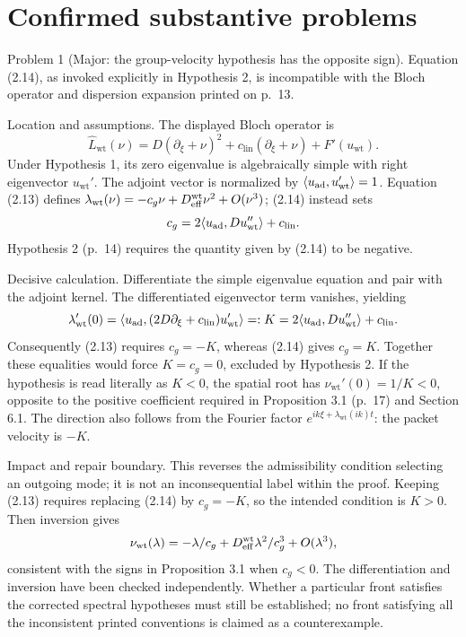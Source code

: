 \documentclass[10pt]{article}
\begin{document}
\section*{Confirmed substantive problems}
Problem 1 (Major: the group-velocity hypothesis has the opposite sign).  Equation (2.14), as invoked explicitly in Hypothesis 2, is incompatible with the Bloch operator and dispersion expansion printed on p. 13.\par
Location and assumptions. The displayed Bloch operator is \[\widehat L_\mathrm{wt}(\nu)
 =D(\partial_\xi+\nu)^2+c_\mathrm{lin}(\partial_\xi+\nu)+F'(u_\mathrm{wt}).\] Under Hypothesis 1, its zero eigenvalue is algebraically simple with right eigenvector \(u_\mathrm{wt}'\). The adjoint vector is normalized by \(\langle u_{\rm ad},u_\mathrm{wt}'\rangle=1\). Equation (2.13) defines \(\lambda_\mathrm{wt}(\nu)=-c_g\nu+D_{\rm eff}^{\mathrm{wt}}\nu^2+O(\nu^3)\); (2.14) instead sets \[c_g=2\langle u_{\rm ad},Du_\mathrm{wt}''\rangle+c_\mathrm{lin}.\] Hypothesis 2 (p. 14) requires the quantity given by (2.14) to be negative.\par
Decisive calculation. Differentiate the simple eigenvalue equation and pair with the adjoint kernel. The differentiated eigenvector term vanishes, yielding \[\lambda_\mathrm{wt}'(0)
 =\langle u_{\rm ad},(2D\partial_\xi+c_\mathrm{lin})u_\mathrm{wt}'\rangle
 =:K=2\langle u_{\rm ad},Du_\mathrm{wt}''\rangle+c_\mathrm{lin}.\] Consequently (2.13) requires \(c_g=-K\), whereas (2.14) gives \(c_g=K\). Together these equalities would force \(K=c_g=0\), excluded by Hypothesis 2. If the hypothesis is read literally as \(K<0\), the spatial root has \(\nu_\mathrm{wt}'(0)=1/K<0\), opposite to the positive coefficient required in Proposition 3.1 (p. 17) and Section 6.1. The direction also follows from the Fourier factor \(e^{ik\xi+\lambda_\mathrm{wt}(ik)t}\): the packet velocity is \(-K\).\par
Impact and repair boundary. This reverses the admissibility condition selecting an outgoing mode; it is not an inconsequential label within the proof. Keeping (2.13) requires replacing (2.14) by \(c_g=-K\), so the intended condition is \(K>0\). Then inversion gives \[\nu_\mathrm{wt}(\lambda)=-\lambda/c_g
                  +D_{\rm eff}^{\mathrm{wt}}\lambda^2/c_g^3+O(\lambda^3),\] consistent with the signs in Proposition 3.1 when \(c_g<0\). The differentiation and inversion have been checked independently. Whether a particular front satisfies the corrected spectral hypotheses must still be established; no front satisfying all the inconsistent printed conventions is claimed as a counterexample.\par
\end{document}
